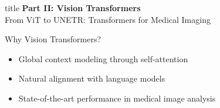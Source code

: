 \documentclass[aspectratio=169]{beamer}
\begin{document}
\begin{frame}[plain]
    \centering
    \vfill
    \begin{beamercolorbox}[center,shadow=true,rounded=true]{title}
        \textbf{Part II: Vision Transformers}\\
        \vspace{0.5em}
        \large From ViT to UNETR: Transformers for Medical Imaging
    \end{beamercolorbox}
    \vfill
    
    \vspace{1em}
    \normalsize
    \begin{block}{Why Vision Transformers?}
        \begin{itemize}
            \item Global context modeling through self-attention
            \item Natural alignment with language models
            \item State-of-the-art performance in medical image analysis
        \end{itemize}
    \end{block}
\end{frame}
\end{document}

